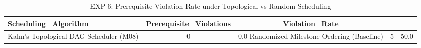 \begin{table}[htbp]
\centering
\caption{EXP-6: Prerequisite Violation Rate under Topological vs Random Scheduling}
\label{tab:exp6_dag_scheduling}
\begin{tabular}{lcc}
\toprule
Scheduling\_Algorithm & Prerequisite\_Violations & Violation\_Rate \\
\midrule
Kahn's Topological DAG Scheduler (M08) & 0 & 0.0%
Randomized Milestone Ordering (Baseline) & 5 & 50.0%
\bottomrule
\end{tabular}
\end{table}
